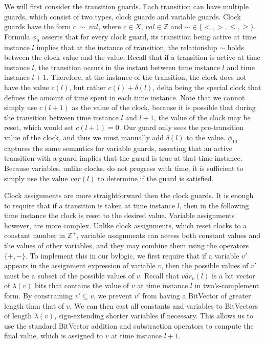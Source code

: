 \documentclass[a4paper,12pt]{article}
\begin{document}
We will first consider the transition guards. Each transition can have multiple
guards, which consist of two types, clock guards and variable guards. Clock
guards have the form \(c\ \sim\ val\), where \(c \in X\), \(val \in
\mathbb{Z}\) and \(\sim \in \{<,>,\leq,\geq\}\). Formula \(\phi_9\) asserts that
for every clock guard, its transition being active at time instance \(l\)
implies that at the instance of transition, the relationship \(\sim\) holds
between the clock value and the value. Recall that if a transition is active at
time instance \(l\), the transition occurs in the instant between time instance
\(l\) and time instance \(l+1\). Therefore, at the instance of the transition,
the clock does not have the value \(c(l)\), but rather \(c(l) + \delta(l)\),
delta being the special clock that defines the amount of time spent in each time
instance. Note that we cannot simply use \(c(l+1)\) as the value of the clock,
because it is possible that during the transition between time instance \(l\)
and \(l+1\), the value of the clock may be reset, which would set \(c(l+1)=0\).
Our guard only sees the pre-transition value of the clock, and thus we must
manually add \(\delta(l)\) to the value.
\(\phi_{10}\) captures the same semantics for variable guards, asserting that an
active transition with a guard implies that the guard is true at that time
instance. Because variables, unlike clocks, do not progress with time, it is
sufficient to simply use the value \(var(l)\) to determine if the guard is satisfied.

Clock assignments are more straightforward then the clock guards. It is enough
to require that if a transition is taken at time instance \(l\), then in the
following time instance the clock is reset to the desired value. Variable
assignments however, are more complex. Unlike clock assignments, which reset
clocks to a constant number in \(\mathbb{Z}^+\), variable assignments can access
both constant values and the values of other variables, and they may combine
them using the operators \(\{+,-\}\). To implement this in our bvlogic, we first
require that if a variable \(v'\) appears in the assignment expression of
variable \(v\), then the possible values of \(v'\) must be a subset of the
possible values of \(v\). Recall that \(\overleftarrow{var_v}(l)\) is a bit
vector of \(\lambda(v)\) bits that contains the value of \(v\) at time instance
\(l\) in two's-complement form. By constraining \(v' \subseteq v\), we prevent
\(v'\) from having a BitVector of greater length than that of \(v\). We can then
cast all constants and variables to BitVectors of length \(\lambda(v)\),
sign-extending shorter variables if necessary. This allows us to use the
standard BitVector addition and substraction operators to compute the final
value, which is assigned to \(v\) at time instance \(l{+}1\).
\end{document}

